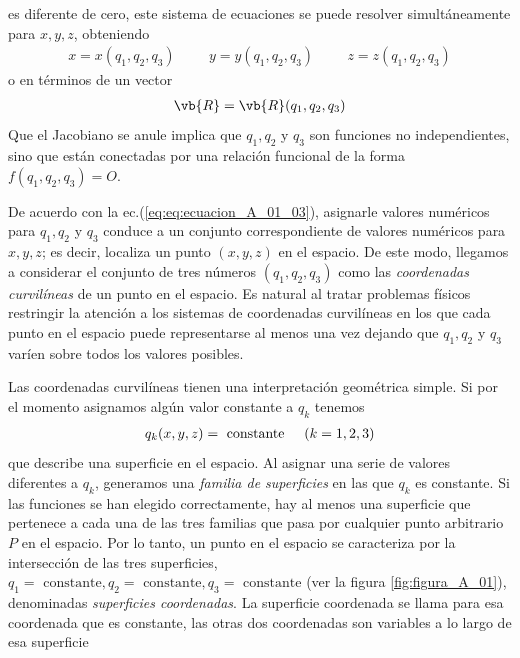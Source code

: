 es diferente de cero, este sistema de ecuaciones se puede resolver simultáneamente para $x, y, z$, obteniendo
\begin{align}
x = x (q_{1}, q_{2}, q_ {3}) \hspace{1cm} y = y (q_{1}, q_{2}, q_ {3}) \hspace{1cm} z = z (q_{1}, q_{2}, q_ {3})
\label{eq:ecuacion_A_01_03}    
\end{align}
o en términos de un vector
\begin{align*}
\vb{R} = \vb{R} (q_{1}, q_{2}, q_{3})
\end{align*}
Que el Jacobiano se anule implica que $q_{1}, q_{2}$ y $q_{3}$ son funciones no independientes, sino que están conectadas por una relación funcional de la forma $f (q_{1}, q_{2}, q_{3}) = O$.
\par
De acuerdo con la ec.(\ref{eq:eq:ecuacion_A_01_03}), asignarle valores numéricos para $q_{1}, q_{2}$ y $q_{3}$ conduce a un conjunto correspondiente de valores numéricos para $x, y, z$; es decir, localiza un punto $(x, y, z)$ en el espacio. De este modo, llegamos a considerar el conjunto de tres números $(q_{1}, q_{2}, q_{3})$ como las \emph{coordenadas curvilíneas} de un punto en el espacio. Es natural al tratar problemas físicos restringir la atención a los sistemas de coordenadas curvilíneas en los que cada punto en el espacio puede representarse al menos una vez dejando que $q_{1}, q_{2}$ y $q_{3}$ varíen sobre todos los valores posibles.
\par
Las coordenadas curvilíneas tienen una interpretación geométrica simple. Si por el momento asignamos algún valor constante a $q_{k}$ tenemos
\begin{align*}
q_{k} (x, y, z) = \mbox{ constante} \hspace{0.5cm} (k = 1, 2, 3)
\end{align*}
 que describe una superficie en el espacio. Al asignar una serie de valores diferentes a $q_{k}$, generamos una \emph{familia de superficies} en las que $q_{k}$ es constante. Si las funciones se han elegido correctamente, hay al menos una superficie que pertenece a cada una de las tres familias que pasa por cualquier punto arbitrario $P$ en el espacio. Por lo tanto, un punto en el espacio se caracteriza por la intersección de las tres superficies, $q_{1} = \mbox{ constante}, q_{2} = \mbox{ constante}, q_{3} = \mbox{ constante}$ (ver la figura \ref{fig:figura_A_01}), denominadas \emph{superficies coordenadas}. La superficie coordenada se llama para esa coordenada que es constante, las otras dos coordenadas son variables a lo largo de esa superficie
